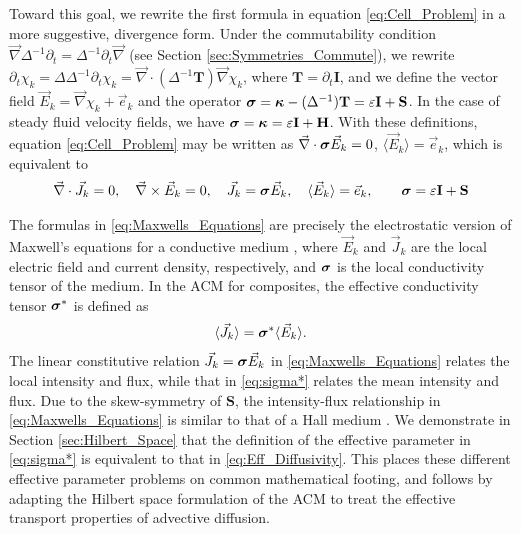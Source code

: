 \documentclass[11pt]{amsart}
\newcommand{\Tb}{\mathbf{T}}
\newcommand{\Hb}{\mathbf{H}}
\newcommand{\Ib}{\mathbf{I}}
\newcommand{\Sb}{\mathbf{S}}
\newcommand\bsig{\mbox{\boldmath${\sigma}$}}
\newcommand\bkappa{\mbox{\boldmath${\kappa}$}}
\begin{document}
Toward this goal, we rewrite the first formula in equation
\eqref{eq:Cell_Problem} in a more suggestive, divergence
form. Under the commutability condition
$\vec{\nabla}\Delta^{-1}\partial_t=\Delta^{-1}\partial_t\vec{\nabla}$ (see Section
\ref{sec:Symmetries_Commute}), we rewrite \cite{Fannjiang:SIAM_JAM:333}
$\partial_t\chi_k=\Delta\Delta^{-1}\partial_t\chi_k=\vec{\nabla}\cdot(\Delta^{-1}\Tb)\vec{\nabla}\chi_k$, where
$\Tb=\partial_t\Ib$, and we define the vector field
$\vec{E}_k=\vec{\nabla}\chi_k+\vec{e}_k$ and the operator
$\bsig=\bkappa-(\Delta^{-1})\Tb=\varepsilon\Ib+\Sb$.  In the case of steady fluid velocity
fields, we have $\bsig=\bkappa=\varepsilon\Ib+\Hb$. With these definitions,
equation \eqref{eq:Cell_Problem} may be written as
$\vec{\nabla}\cdot\bsig\vec{E}_k=0$, $\langle\vec{E}_k\rangle=\vec{e}_k$, which is
equivalent to    
%
\begin{align}\label{eq:Maxwells_Equations}    
  \vec{\nabla}\cdot\vec{J}_k=0, \quad
  \vec{\nabla}\times\vec{E}_k=0, \quad
  \vec{J}_k=\bsig\vec{E}_k,\quad
  \langle\vec{E}_k\rangle=\vec{e}_k,\qquad
  \bsig%
       =\varepsilon\Ib+\Sb
\end{align}
%




The formulas in \eqref{eq:Maxwells_Equations} are precisely the
electrostatic version of Maxwell's equations for a conductive medium
\cite{Golden:CMP-473}, where $\vec{E}_k$ and $\vec{J}_k$ are the local
electric field and current density, respectively, and $\bsig$ is the
local conductivity tensor of the medium. In the ACM for composites,
the effective conductivity tensor $\bsig^*$ is defined as
% 
\begin{align}\label{eq:sigma*}
  \langle\vec{J}_k\rangle=\bsig^*\langle\vec{E}_k\rangle.
\end{align}
%
The linear constitutive relation $\vec{J}_k=\bsig\vec{E}_k$ in
\eqref{eq:Maxwells_Equations} relates the local intensity and flux,
while that in \eqref{eq:sigma*} relates the mean intensity and
flux. Due to the skew-symmetry of $\Sb$, the intensity-flux
relationship in \eqref{eq:Maxwells_Equations} is similar to that of a
Hall medium \cite{Isichenko:JNS:1991:375}. We demonstrate in Section
\ref{sec:Hilbert_Space} that the definition of the effective parameter
in \eqref{eq:sigma*} is equivalent to that in
\eqref{eq:Eff_Diffusivity}. This places these different effective
parameter problems on common mathematical footing, and follows by
adapting the Hilbert space formulation of the ACM to treat the 
effective transport properties of advective diffusion.        
\end{document}
